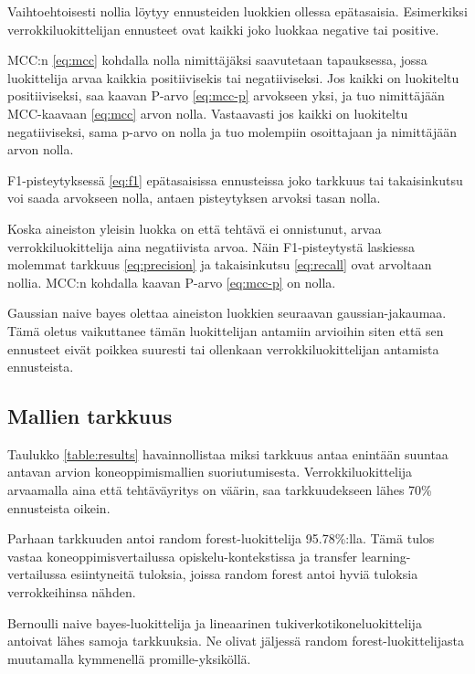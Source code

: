 \documentclass[finnish,twoside,openright]{HYgraduMLDS}
\begin{document}
Vaihtoehtoisesti nollia löytyy ennusteiden luokkien ollessa epätasaisia. Esimerkiksi verrokkiluokittelijan ennusteet ovat kaikki joko luokkaa negative tai positive.

MCC:n \eqref{eq:mcc} kohdalla nolla nimittäjäksi saavutetaan tapauksessa, jossa luokittelija arvaa kaikkia positiivisekis tai negatiiviseksi. Jos kaikki on luokiteltu positiiviseksi, saa kaavan P-arvo \eqref{eq:mcc-p} arvokseen yksi, ja tuo nimittäjään MCC-kaavaan \eqref{eq:mcc} arvon nolla. Vastaavasti jos kaikki on luokiteltu negatiiviseksi, sama p-arvo on nolla ja tuo molempiin osoittajaan ja nimittäjään arvon nolla.

F1-pisteytyksessä \eqref{eq:f1} epätasaisissa ennusteissa joko tarkkuus tai takaisinkutsu voi saada arvokseen nolla, antaen pisteytyksen arvoksi tasan nolla.

Koska aineiston yleisin luokka on että tehtävä ei onnistunut, arvaa verrokkiluokittelija aina negatiivista arvoa. Näin F1-pisteytystä laskiessa molemmat tarkkuus \eqref{eq:precision} ja takaisinkutsu \eqref{eq:recall} ovat arvoltaan nollia. MCC:n kohdalla kaavan P-arvo \eqref{eq:mcc-p} on nolla.

Gaussian naive bayes olettaa aineiston luokkien seuraavan gaussian-jakaumaa. Tämä oletus vaikuttanee tämän luokittelijan antamiin arvioihin siten että sen ennusteet eivät poikkea suuresti tai ollenkaan verrokkiluokittelijan antamista ennusteista.


\subsection{Mallien tarkkuus}

Taulukko \ref{table:results} havainnollistaa miksi tarkkuus antaa enintään suuntaa antavan arvion koneoppimismallien suoriutumisesta. Verrokkiluokittelija arvaamalla aina että tehtäväyritys on väärin, saa tarkkuudekseen lähes 70\% ennusteista oikein.

Parhaan tarkkuuden antoi random forest-luokittelija 95.78\%:lla. Tämä tulos vastaa koneoppimisvertailussa\cite{Ahadi:2015:EML:2787622.2787717} opiskelu-kontekstissa ja transfer learning-vertailussa\cite{lagus2018transfer} esiintyneitä tuloksia, joissa random forest antoi hyviä tuloksia verrokkeihinsa nähden.

Bernoulli naive bayes-luokittelija ja lineaarinen tukiverkotikoneluokittelija antoivat lähes samoja tarkkuuksia. Ne olivat jäljessä random forest-luokittelijasta muutamalla kymmenellä promille-yksiköllä.
\end{document}
